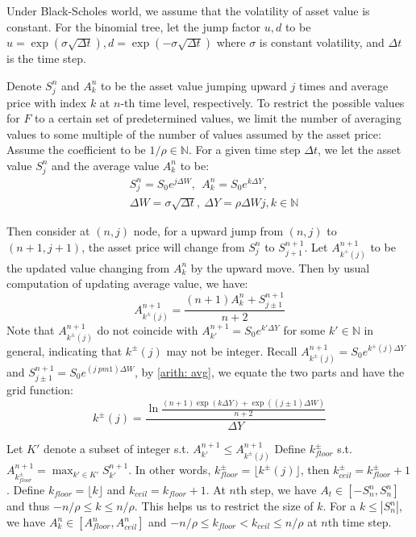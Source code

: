 \documentclass[10pt, a4paper, twocolumn]{article} %
\begin{document}
Under Black-Scholes world, we assume that the volatility of asset value is constant. For the binomial tree, let the jump factor $ u, d $ to be $ u=\exp(\sigma\sqrt{\Delta t}), d=\exp(-\sigma\sqrt{\Delta t}) $ where $ \sigma $ is constant volatility, and $ \Delta t $ is the time step. 

Denote $ S^n_j $ and $ A^n_k $ to be the asset value jumping upward $ j $ times and average price with index $ k $ at $ n $-th time level, respectively. To restrict the possible values for $ F $ to a certain set of predetermined values, we limit the number of averaging values to some multiple of the number of values assumed by the asset price: Assume the coefficient to be $ 1 / \rho \in \mathbb{N} $. For a given time step $ \Delta t $, we let the asset value $ S^n_j $ and the average value $ A^n_k $ to be:
\begin{equation}
\begin{split}
&S^n_j= S_0 e^{j \Delta W}, \ \ A^n_k = S_0 e^{k \Delta Y}, \\ &\Delta W = \sigma\sqrt{\Delta t},\ \Delta Y = \rho\Delta W j, k \in\mathbb{N}
\end{split}
\end{equation}

Then consider at $ (n, j) $ node, for a upward jump from $ (n, j) $ to $ (n + 1, j + 1) $, the asset price will change from $ S^n_j $ to $ S^{n + 1}_{j + 1} $. Let $ A^{n + 1}_{k^+(j)} $ to be the updated value changing from $ A^n_k $ by the upward move. Then by usual computation of updating average value, we have:
\begin{equation}\label{arith: avg}
A^{n + 1}_{k^\pm(j)} = \frac{(n + 1) A^n_k + S^{n +1}_{j \pm 1}}{n + 2}
\end{equation}
Note that $ A^{n + 1}_{k^{\pm}(j)} $ do not coincide with $ A^{n + 1}_{k'} = S_0 e^{k' \Delta Y} $ for some $ k' \in \mathbb{N} $ in general, indicating that $ k^\pm(j) $ may not be integer. Recall $ A^{n + 1}_{k^{\pm}(j)} = S_0 e^{k^{\pm}(j) \Delta Y} $ and $ S^{n + 1}_{j \pm 1} = S_0 e^{(j \ pm 1) \Delta W} $, by \eqref{arith: avg}, we equate the two parts and have the grid function:
\begin{equation}\label{arith: grid func}
k^{\pm}(j) = \frac{\ln\frac{(n + 1) \exp(k \Delta Y) + \exp((j \pm 1) \Delta W)}{n + 2}}{\Delta Y}
\end{equation}

Let $ K' $ denote a subset of integer s.t. $ A^{n + 1}_{k'} \leq A^{n + 1}_{k^{\pm}(j)} $ Define $ k^{\pm}_{floor} $ s.t. $ A^{n + 1}_{k^{\pm}_{floor}} = \max_{k' \in K'} S^{n + 1}_{k'} $. In other words, $ k^{\pm}_{floor} = \lfloor k^{\pm}(j) \rfloor $, then $ k^\pm_{ceil} = k^\pm_{floor} + 1 $. Define $ k_{floor} = \lfloor k \rfloor $ and $ k_{ceil} = k_{floor} + 1 $. At $ n $th step, we have $ A_t \in [-S^n_n, S^n_n] $ and thus $ -n/\rho \leq k \leq n/\rho $. This helps us to restrict the size of $ k $. For a $ k \leq | S^n_n | $, we have $ A^n_k \in [A^n_{floor}, A^n_{ceil}] $ and $ -n/\rho \leq k_{floor} < k_{ceil} \leq n/\rho $ at $ n $th time step.
\end{document}
